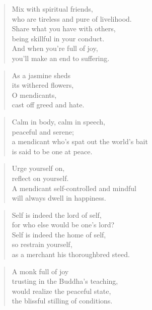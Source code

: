 \documentclass[12pt,openany]{book}%
\begin{document}
\begin{verse}%
Mix with spiritual friends, \\
who are tireless and pure of livelihood. \\
Share what you have with others, \\
being skillful in your conduct. \\
And when you’re full of joy, \\
you’ll make an end to suffering. 

%
\end{verse}

\begin{verse}%
As a jasmine sheds \\
its withered flowers, \\
O mendicants, \\
cast off greed and hate. 

%
\end{verse}

\begin{verse}%
Calm in body, calm in speech, \\
peaceful and serene; \\
a mendicant who’s spat out the world’s bait \\
is said to be one at peace. 

%
\end{verse}

\begin{verse}%
Urge yourself on, \\
reflect on yourself. \\
A mendicant self-controlled and mindful \\
will always dwell in happiness. 

%
\end{verse}

\begin{verse}%
Self is indeed the lord of self, \\
for who else would be one’s lord? \\
Self is indeed the home of self, \\
so restrain yourself, \\
as a merchant his thoroughbred steed. 

%
\end{verse}

\begin{verse}%
A monk full of joy \\
trusting in the Buddha’s teaching, \\
would realize the peaceful state, \\
the blissful stilling of conditions. 

%
\end{verse}
\end{document}
